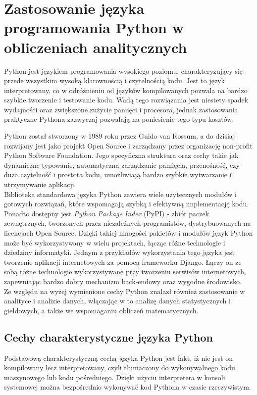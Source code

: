 
\chapter{Zastosowanie języka programowania Python w obliczeniach analitycznych}
Python jest językiem programowania wysokiego poziomu, charakteryzujący się przede wszystkim wysoką klarownością i czytelnością kodu.
Jest to język interpretowany, co w odróżnieniu od języków kompilowanych pozwala na bardzo szybkie tworzenie i testowanie kodu.
Wadą tego rozwiązania jest niestety spadek wydajności oraz zwiększone zużycie pamięci i procesora, jednak zastosowania praktyczne Pythona zazwyczaj pozwalają na poniesienie tego typu kosztów.

Python został stworzony w 1989 roku przez Guido van Rossum, a do dzisiaj rozwijany jest jako projekt Open Source i zarządzany przez organizację non-profit Python Software Foundation.
Jego specyficzna struktura oraz cechy takie jak dynamiczne typowanie, automatyczna zarządzanie pamięcią, przenośność, czy duża czytelność i prostota kodu, 
umożliwiają bardzo szybkie wytwarzanie i utrzymywanie aplikacji.\\

Biblioteka standardowa języka Python zawiera wiele użytecznych modułów i gotowych rozwiązań, które wspomagają szybką i efektywną implementację kodu.
Ponadto dostępny jest \textit{Python Package Index} (PyPI) - zbiór paczek zewnętrznych, tworzonych przez niezależnych programistów, dystrybuowanych na licencjach Open Source.
Dzięki takiej mnogości pakietów i modułów język Python może być wykorzystywany w wielu projektach, łącząc różne technologie i dziedziny informatyki.
Jednym z przykładów wykorzystania tego języka jest tworzenie aplikacji internetowych za pomocą frameworku Django.
Łączy on ze sobą różne technologie wykorzystywane przy tworzeniu serwisów internetowych, zapewniając bardzo dobry mechanizm back-endowy oraz wygodne środowisko.\\

Ze względu na wyżej wymienione cechy Python znalazł również zastosowanie w analityce i analizie danych, włączając w to analizę danych statystycznych i giełdowych, a także we wspomaganiu obliczeń matematycznych.


\section{Cechy charakterystyczne języka Python}
Podstawową charakterystyczną cechą języka Python jest fakt, iż nie jest on kompilowany lecz interpretowany, czyli tłumaczony do wykonywalnego kodu maszynowego lub kodu pośredniego.
Dzięki użyciu interpretera w konsoli systemowej można bezpośrednio wykonywać kod Pythona w czasie rzeczywistym.


